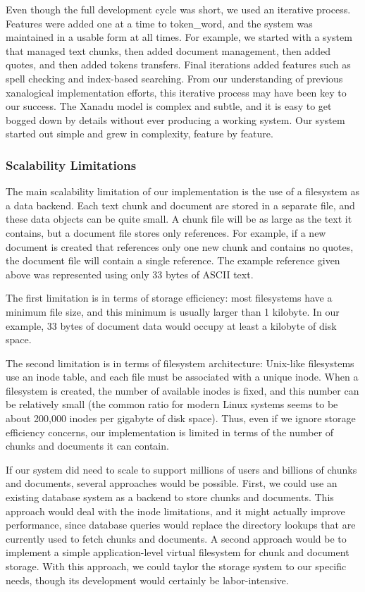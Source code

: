 \documentclass{acm_proc_article-sp}
\newcommand{\tw}{token\_word}
\begin{document}
Even though the full development cycle was short, we used an iterative process.
Features were added one at a time to \tw, and the system was maintained in a usable form at all times.
For example, we started with a system that managed text chunks, then added document management, then added quotes, and then added tokens transfers.
Final iterations added features such as spell checking and index-based searching.
From our understanding of previous xanalogical implementation efforts, this iterative process may have been key to our success.
The Xanadu model is complex and subtle, and it is easy to get bogged down by details without ever producing a working system.
Our system started out simple and grew in complexity, feature by feature.


\subsubsection{Scalability Limitations}
\label{sec:Scalability}
The main scalability limitation of our implementation is the use of a filesystem as a data backend.
Each text chunk and document are stored in a separate file, and these data objects can be quite small.
A chunk file will be as large as the text it contains, but a document file stores only references.
For example, if a new document is created that references only one new chunk and contains no quotes, the document file will contain a single reference.
The example reference given above was represented using only 33 bytes of ASCII text.

The first limitation is in terms of storage efficiency:  most filesystems have a minimum file size, and this minimum is usually larger than 1 kilobyte.
In our example, 33 bytes of document data would occupy at least a kilobyte of disk space.

The second limitation is in terms of filesystem architecture:  Unix-like filesystems use an inode table, and each file must be associated with a unique inode.
When a filesystem is created, the number of available inodes is fixed, and this number can be relatively small (the common ratio for modern Linux systems seems to be about 200,000 inodes per gigabyte of disk space). \cite{OperatingSystems}
Thus, even if we ignore storage efficiency concerns, our implementation is limited in terms of the number of chunks and documents it can contain.

If our system did need to scale to support millions of users and billions of chunks and documents, several approaches would be possible.
First, we could use an existing database system as a backend to store chunks and documents.
This approach would deal with the inode limitations, and it might actually improve performance, since database queries would replace the directory lookups that are currently used to fetch chunks and documents.
A second approach would be to implement a simple application-level virtual filesystem for chunk and document storage.
With this approach, we could taylor the storage system to our specific needs, though its development would certainly be labor-intensive.
\end{document}

